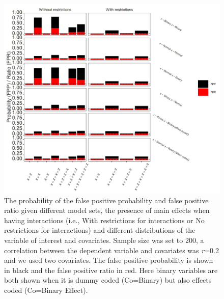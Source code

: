 \begin{figure}[hbt!]
\includegraphics[scale=0.95]{R/Analysis/Result/Figures/Figure1ASI.jpeg}
\centering
\caption{The probability of the false positive probability and false positive ratio given different model sets, the presence of main effects when having interactions (i.e., With restrictions for interactions or No restrictions for interactions) and different distributions of the variable of interest and covariates. Sample size was set to 200, a correlation between the dependent variable and covariates was \textit{r}=0.2 and we used two covariates. The false positive probability is shown in black and the false positive ratio in red. Here binary variables are both shown when it is dummy coded (Co=Binary) but also effects coded (Co=Binary Effect).}
\label{fig:mainfigure}
\end{figure}


